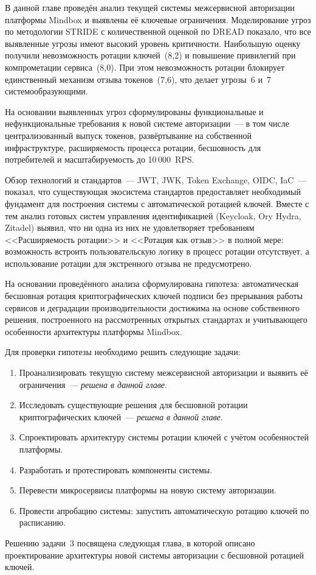 В данной главе проведён анализ текущей системы межсервисной авторизации
платформы Mindbox и выявлены её ключевые ограничения.
Моделирование угроз по методологии STRIDE с количественной оценкой по DREAD
показало, что все выявленные угрозы имеют высокий уровень критичности.
Наибольшую оценку получили невозможность ротации ключей~(8,2)
и повышение привилегий при компрометации сервиса~(8,0).
При этом невозможность ротации блокирует единственный механизм отзыва токенов~(7,6),
что делает угрозы~6 и~7 системообразующими.

На основании выявленных угроз сформулированы функциональные и нефункциональные
требования к новой системе авторизации~--- в том числе централизованный выпуск
токенов, развёртывание на собственной инфраструктуре,
расширяемость процесса ротации, бесшовность для потребителей
и масштабируемость до 10\,000~RPS.

Обзор технологий и стандартов~--- JWT, JWK, Token Exchange, OIDC, IaC~---
показал, что существующая экосистема стандартов предоставляет
необходимый фундамент для построения системы с автоматической ротацией ключей.
Вместе с тем анализ готовых систем управления идентификацией
(Keycloak, Ory Hydra, Zitadel) выявил,
что ни одна из них не удовлетворяет требованиям
<<Расширяемость ротации>> и <<Ротация как отзыв>> в полной мере:
возможность встроить пользовательскую логику в процесс ротации отсутствует,
а использование ротации для экстренного отзыва не предусмотрено.

На основании проведённого анализа сформулирована гипотеза:
автоматическая бесшовная ротация криптографических ключей подписи
без прерывания работы сервисов и деградации производительности
достижима на основе собственного решения,
построенного на рассмотренных открытых стандартах
и учитывающего особенности архитектуры платформы Mindbox.

Для проверки гипотезы необходимо решить следующие задачи:
\begin{enumerate}
  \item Проанализировать текущую систему межсервисной авторизации
    и выявить её ограничения~--- \emph{решена в данной главе}.
  \item Исследовать существующие решения для бесшовной ротации
    криптографических ключей~--- \emph{решена в данной главе}.
  \item Спроектировать архитектуру системы ротации ключей
    с учётом особенностей платформы.
  \item Разработать и протестировать компоненты системы.
  \item Перевести микросервисы платформы на новую систему авторизации.
  \item Провести апробацию системы:
    запустить автоматическую ротацию ключей по расписанию.
\end{enumerate}

Решению задачи~3 посвящена следующая глава,
в которой описано проектирование архитектуры новой системы авторизации
с бесшовной ротацией ключей.

